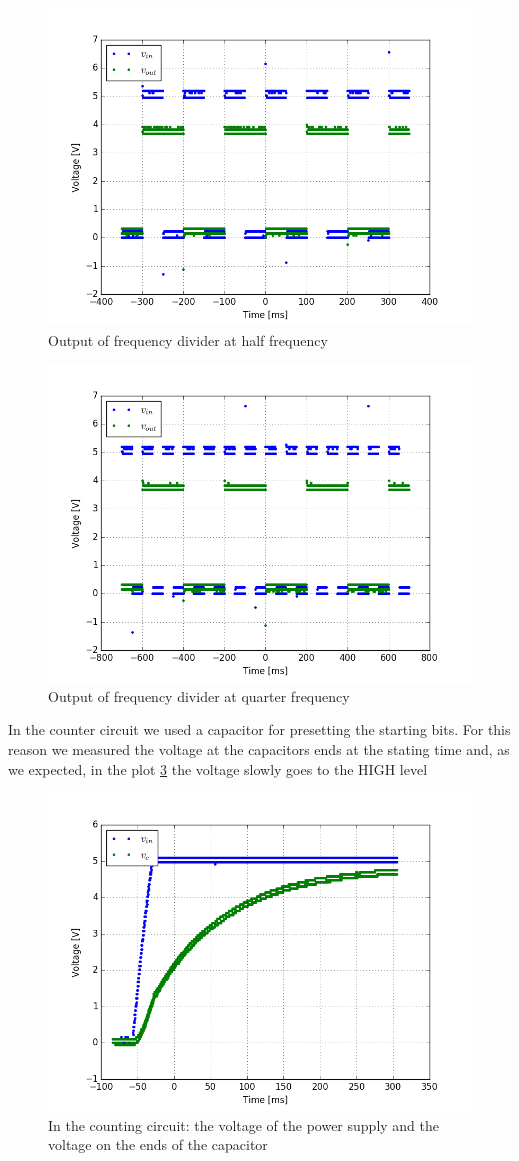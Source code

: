 \begin{figure}[H]
\centering
\includegraphics[width=.7\textwidth]{11/freq_div_m.png}
\caption{Output of frequency divider at half frequency}\label{freq_div_m}
\end{figure}
\begin{figure}[H]
\centering
\includegraphics[width=.7\textwidth]{11/freq_div_q.png}
\caption{Output of frequency divider at quarter frequency}\label{freq_div_q}
\end{figure}
In the counter circuit we used a capacitor for presetting the starting bits. For this reason we measured the voltage at the capacitors ends at the stating time and, as we expected, in the plot \ref{start_count} the voltage slowly goes to the HIGH level
\begin{figure}[H]
\centering
\includegraphics[width=.7\textwidth]{11/start_count.png}
\caption{In the counting circuit: the voltage of the power supply and the voltage on the ends of the capacitor}\label{start_count}
\end{figure}
